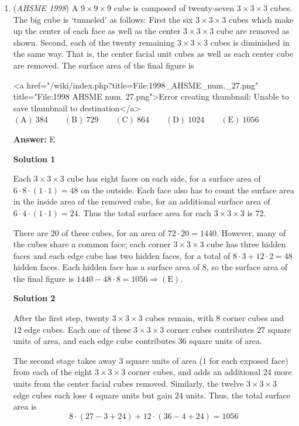 \begin{enumerate}
 


	\item (\textit{AHSME 1998}) A $9 \times 9 \times 9$ cube is composed of twenty-seven $3 \times 3 \times 3$ cubes. The big cube is ‘tunneled’ as follows: First the six $3 \times 3 \times 3$ cubes which make up the center of each face as well as the center $3 \times 3 \times 3$ cube are removed as shown. Second, each of the twenty remaining $3 \times 3 \times 3$ cubes is diminished in the same way. That is, the center facial unit cubes as well as each center cube are removed. The surface area of the final figure is 


 <a href="/wiki/index.php?title=File:1998\_AHSME\_num.\_27.png" title="File:1998 AHSME num. 27.png">Error creating thumbnail: Unable to save thumbnail to destination</a>$\mathrm{(A) \ } 384 \qquad \mathrm{(B) \ } 729 \qquad \mathrm{(C) \ } 864 \qquad \mathrm{(D) \ } 1024 \qquad \mathrm{(E) \ } 1056$

 \textbf{Answer: }E



\textbf{Solution 1}

Each $3 \times 3 \times 3$ cube has eight faces on each side, for a surface area of $6 \cdot 8 \cdot (1 \cdot 1) = 48$ on the outside. Each face also has to count the surface area in the inside area of the removed cube, for an additional surface area of $6 \cdot 4 \cdot (1 \cdot 1) = 24$. Thus the total surface area for each $3 \times 3 \times 3$ is $72$.

 There are $20$ of these cubes, for an area of $72 \cdot 20 = 1440$. However, many of the cubes share a common face; each corner $3\times 3\times 3$ cube has three hidden faces and each edge cube has two hidden faces, for a total of $8\cdot 3 + 12\cdot 2 = 48$ hidden faces. Each hidden face has a surface area of $8$, so the surface area of the final figure is $1440 - 48 \cdot 8 = 1056 \Rightarrow \mathrm{(E)}$.  

 



\textbf{Solution 2}

After the first step, twenty $3 \times 3 \times 3$ cubes remain, with $8$ corner cubes and $12$ edge cubes. Each one of these $3 \times 3 \times 3$ corner cubes contributes $27$ square units of area, and each edge cube contributes $36$ square units of area. 

 The second stage takes away $3$ square units of area ($1$ for each exposed face) from each of the eight $3 \times 3 \times 3$ corner cubes, and adds an additional $24$ more units from the center facial cubes removed. Similarly, the twelve $3\times 3\times 3$ edge cubes each lose $4$ square units but gain $24$ units. Thus, the total surface area is 
 \[8 \cdot (27 - 3 + 24) + 12 \cdot (36 - 4 + 24) = 1056\]




\end{enumerate}
